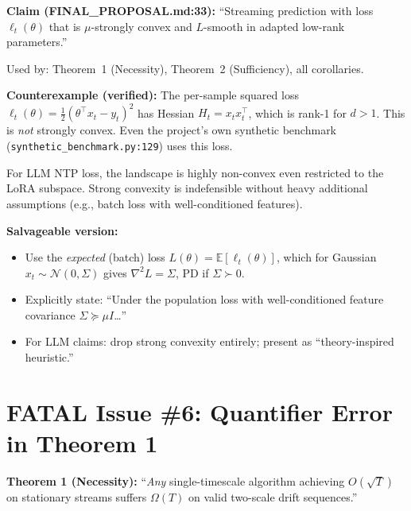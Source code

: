 \documentclass[11pt,a4paper]{article}
\begin{document}
\begin{beforebox}
\textbf{Claim (FINAL\_PROPOSAL.md:33):}
``Streaming prediction with loss $\ell_t(\theta)$ that is $\mu$-strongly convex
and $L$-smooth in adapted low-rank parameters.''

Used by: Theorem~1 (Necessity), Theorem~2 (Sufficiency), all corollaries.
\end{beforebox}

\begin{whywrongbox}
\textbf{Counterexample (verified):}
The per-sample squared loss
$\ell_t(\theta) = \tfrac{1}{2}(\theta^\top x_t - y_t)^2$
has Hessian $H_t = x_t x_t^\top$, which is rank-1 for $d > 1$.
This is \emph{not} strongly convex. Even the project's own synthetic
benchmark (\texttt{synthetic\_benchmark.py:129}) uses this loss.

For LLM NTP loss, the landscape is highly non-convex even restricted
to the LoRA subspace. Strong convexity is indefensible without heavy
additional assumptions (e.g., batch loss with well-conditioned features).
\end{whywrongbox}

\begin{afterbox}
\textbf{Salvageable version:}
\begin{itemize}[nosep]
\item Use the \emph{expected} (batch) loss $L(\theta) = \mathbb{E}[\ell_t(\theta)]$,
      which for Gaussian $x_t \sim \mathcal{N}(0, \Sigma)$ gives
      $\nabla^2 L = \Sigma$, PD if $\Sigma \succ 0$.
\item Explicitly state: ``Under the population loss with well-conditioned
      feature covariance $\Sigma \succeq \mu I$\ldots''
\item For LLM claims: drop strong convexity entirely; present as
      ``theory-inspired heuristic.''
\end{itemize}
\end{afterbox}

\section{FATAL Issue \#6: Quantifier Error in Theorem 1}

\begin{beforebox}
\textbf{Theorem 1 (Necessity):}
``\emph{Any} single-timescale algorithm achieving $O(\sqrt{T})$ on stationary
streams suffers $\Omega(T)$ on valid two-scale drift sequences.''
\end{beforebox}
\end{document}
